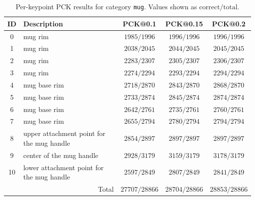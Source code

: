\begin{table}[h]
\centering
\small
\caption{Per-keypoint PCK results for category \texttt{mug}. Values shown as $\text{correct}/\text{total}$.}
\label{tab:pck_mug}
\begin{tabular}{cl ccc}
\toprule
ID & Description & PCK@0.1 & PCK@0.15 & PCK@0.2 \\
\midrule
0 & mug rim & $1985/1996$ & $1996/1996$ & $1996/1996$ \\
1 & mug rim & $2038/2045$ & $2044/2045$ & $2045/2045$ \\
2 & mug rim & $2283/2307$ & $2305/2307$ & $2306/2307$ \\
3 & mug rim & $2274/2294$ & $2293/2294$ & $2294/2294$ \\
4 & mug base rim & $2718/2870$ & $2843/2870$ & $2868/2870$ \\
5 & mug base rim & $2733/2874$ & $2845/2874$ & $2874/2874$ \\
6 & mug base rim & $2642/2761$ & $2735/2761$ & $2760/2761$ \\
7 & mug base rim & $2655/2794$ & $2780/2794$ & $2794/2794$ \\
8 & upper attachment point for the mug handle & $2854/2897$ & $2897/2897$ & $2897/2897$ \\
9 & center of the mug handle & $2928/3179$ & $3159/3179$ & $3178/3179$ \\
10 & lower attachment point for the mug handle & $2597/2849$ & $2807/2849$ & $2841/2849$ \\
\midrule
\multicolumn{2}{r}{Total} & $27707/28866$ & $28704/28866$ & $28853/28866$ \\
\bottomrule
\end{tabular}
\end{table}

